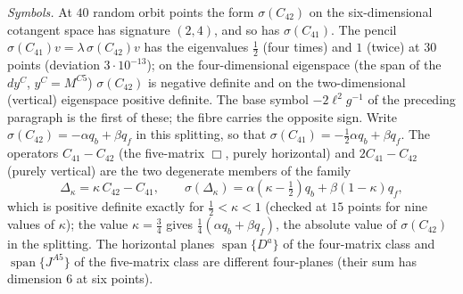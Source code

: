 \emph{Symbols.} At \(40\) random orbit points the form \(\sigma(C_{42})\) on the six-dimensional cotangent space has signature \((2,4)\), and so has \(\sigma(C_{41})\). The pencil \(\sigma(C_{41})v=\lambda\,\sigma(C_{42})v\) has the eigenvalues \(\tfrac12\) (four times) and \(1\) (twice) at \(30\) points (deviation \(3\cdot10^{-13}\)); on the four-dimensional eigenspace (the span of the \(dy^C\), \(y^C=M^{C5}\)) \(\sigma(C_{42})\) is negative definite and on the two-dimensional (vertical) eigenspace positive definite. The base symbol \(-2\ell^2g^{-1}\) of the preceding paragraph is the first of these; the fibre carries the opposite sign. Write \(\sigma(C_{42})=-\alpha q_b+\beta q_f\) in this splitting, so that \(\sigma(C_{41})=-\tfrac12\alpha q_b+\beta q_f\). The operators \(C_{41}-C_{42}\) (the five-matrix \(\Box\), purely horizontal) and \(2C_{41}-C_{42}\) (purely vertical) are the two degenerate members of the family
\[
\Delta_\kappa=\kappa\,C_{42}-C_{41},\qquad \sigma(\Delta_\kappa)=\alpha(\kappa-\tfrac12)q_b+\beta(1-\kappa)q_f ,
\]
which is positive definite exactly for \(\tfrac12<\kappa<1\) (checked at \(15\) points for nine values of \(\kappa\)); the value \(\kappa=\tfrac34\) gives \(\tfrac14(\alpha q_b+\beta q_f)\), the absolute value of \(\sigma(C_{42})\) in the splitting. The horizontal planes \(\operatorname{span}\{D^a\}\) of the four-matrix class and \(\operatorname{span}\{J^{A5}\}\) of the five-matrix class are different four-planes (their sum has dimension \(6\) at six points).

